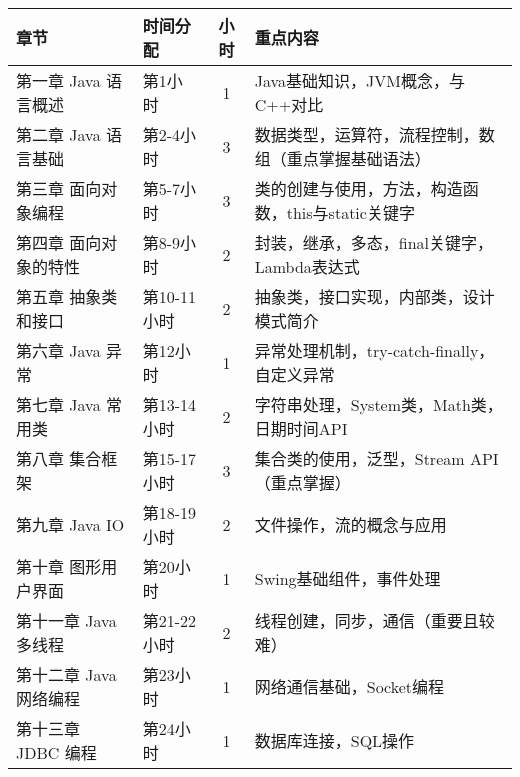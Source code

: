 \documentclass{../note}
\begin{document}
\begin{tabular}{|l|l|c|p{8cm}|}
  \hline
  \textbf{章节} & \textbf{时间分配} & \textbf{小时} & \textbf{重点内容} \\
  \hline
  第一章 Java 语言概述 & 第1小时 & 1 & Java基础知识，JVM概念，与C++对比 \\
  \hline
  第二章 Java 语言基础 & 第2-4小时 & 3 & 数据类型，运算符，流程控制，数组（重点掌握基础语法） \\
  \hline
  第三章 面向对象编程 & 第5-7小时 & 3 & 类的创建与使用，方法，构造函数，this与static关键字 \\
  \hline
  第四章 面向对象的特性 & 第8-9小时 & 2 & 封装，继承，多态，final关键字，Lambda表达式 \\
  \hline
  第五章 抽象类和接口 & 第10-11小时 & 2 & 抽象类，接口实现，内部类，设计模式简介 \\
  \hline
  第六章 Java 异常 & 第12小时 & 1 & 异常处理机制，try-catch-finally，自定义异常 \\
  \hline
  第七章 Java 常用类 & 第13-14小时 & 2 & 字符串处理，System类，Math类，日期时间API \\
  \hline
  第八章 集合框架 & 第15-17小时 & 3 & 集合类的使用，泛型，Stream API（重点掌握） \\
  \hline
  第九章 Java IO & 第18-19小时 & 2 & 文件操作，流的概念与应用 \\
  \hline
  第十章 图形用户界面 & 第20小时 & 1 & Swing基础组件，事件处理 \\
  \hline
  第十一章 Java 多线程 & 第21-22小时 & 2 & 线程创建，同步，通信（重要且较难） \\
  \hline
  第十二章 Java 网络编程 & 第23小时 & 1 & 网络通信基础，Socket编程 \\
  \hline
  第十三章 JDBC 编程 & 第24小时 & 1 & 数据库连接，SQL操作 \\
  \hline
\end{tabular}
\end{document}
